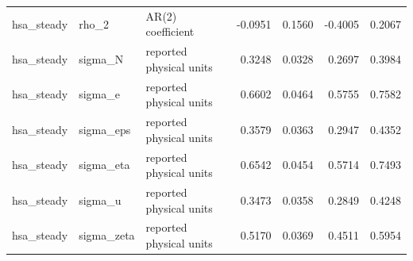 \begin{tabular}{lllrrrr}
hsa\_steady & rho\_2 & AR(2) coefficient & -0.0951 & 0.1560 & -0.4005 & 0.2067 \\
hsa\_steady & sigma\_N & reported physical units & 0.3248 & 0.0328 & 0.2697 & 0.3984 \\
hsa\_steady & sigma\_e & reported physical units & 0.6602 & 0.0464 & 0.5755 & 0.7582 \\
hsa\_steady & sigma\_eps & reported physical units & 0.3579 & 0.0363 & 0.2947 & 0.4352 \\
hsa\_steady & sigma\_eta & reported physical units & 0.6542 & 0.0454 & 0.5714 & 0.7493 \\
hsa\_steady & sigma\_u & reported physical units & 0.3473 & 0.0358 & 0.2849 & 0.4248 \\
hsa\_steady & sigma\_zeta & reported physical units & 0.5170 & 0.0369 & 0.4511 & 0.5954 \\
\bottomrule
\end{tabular}
